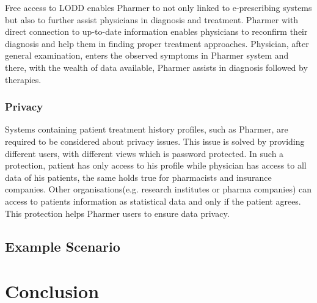 \documentclass[journal]{IEEEtran}
\begin{document}
Free access to LODD enables Pharmer to not only linked to e-prescribing systems but also to further assist physicians in diagnosis and treatment. Pharmer with direct connection to up-to-date information enables physicians to reconfirm their diagnosis and help them in finding proper treatment approaches.
Physician, after general examination, enters the observed symptoms in Pharmer system and there, with the wealth of data available, Pharmer assists in diagnosis followed by therapies.

\subsubsection{Privacy}
 Systems containing patient treatment history profiles, such as Pharmer, are required to be considered about privacy issues.
 This issue is solved by providing different users, with different views which is password protected.
 In such a protection, patient has only access to his profile while physician has access to all data of his patients, the same holds true for pharmacists and insurance companies.
 Other organisations(e.g. research institutes or pharma companies) can access to patients information as statistical data and only if the patient agrees.
 This protection helps Pharmer users to ensure data privacy.

\subsection{Example Scenario}
\label{sec:example}


\section{Conclusion}
\label{sec:conclusion}

\begin{spacing}{0.3}


\end{spacing}

\end{document}
